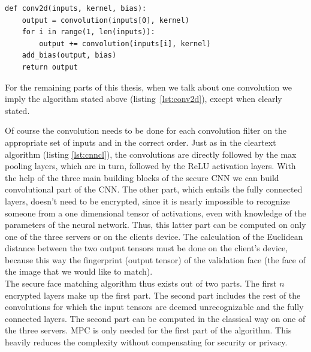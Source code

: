 \begin{lstlisting}[caption={Code for computing total 2D convolution}, label={lst:conv2d}, frame=single, breaklines=true]
def conv2d(inputs, kernel, bias):
    output = convolution(inputs[0], kernel)
    for i in range(1, len(inputs)):
        output += convolution(inputs[i], kernel)
    add_bias(output, bias)
    return output
\end{lstlisting}

For the remaining parts of this thesis, when we talk about one convolution we imply the algorithm stated above (listing~\ref{lst:conv2d}), except when clearly stated.

Of course the convolution needs to be done for each convolution filter on the appropriate set of inputs and in the correct order. Just as in the cleartext algorithm (listing \ref{lst:cnncl}), the convolutions are directly followed by the max pooling layers, which are in turn, followed by the ReLU activation layers. With the help of the three main building blocks of the secure CNN we can build convolutional part of the CNN. The other part, which entails the fully connected layers, doesn't need to be encrypted, since it is nearly impossible to recognize someone from a one dimensional tensor of activations, even with knowledge of the parameters of the neural network. Thus, this latter part can be computed on only one of the three servers or on the clients device. The calculation of the Euclidean distance between the two output tensors must be done on the client's device, because this way the fingerprint (output tensor) of the validation face (the face of the image that we would like to match).\\

The secure face matching algorithm thus exists out of two parts. The first $n$ encrypted layers make up the first part. The second part includes the rest of the convolutions for which the input tensors are deemed unrecognizable and the fully connected layers. The second part can be computed in the classical way on one of the three servers. MPC is only needed for the first part of the algorithm. This heavily reduces the complexity without compensating for security or privacy.

